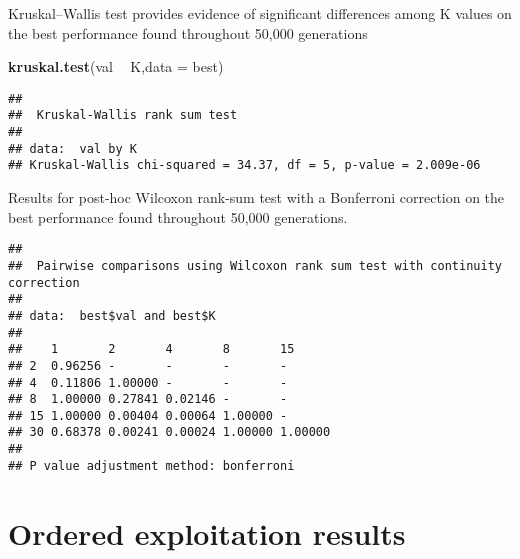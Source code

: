 \documentclass[]{book}
\newenvironment{Shaded}{\begin{snugshade}}{\end{snugshade}}
\newcommand{\DataTypeTok}[1]{\textcolor[rgb]{0.13,0.29,0.53}{#1}}
\newcommand{\KeywordTok}[1]{\textcolor[rgb]{0.13,0.29,0.53}{\textbf{#1}}}
\newcommand{\NormalTok}[1]{#1}
\newcommand{\OperatorTok}[1]{\textcolor[rgb]{0.81,0.36,0.00}{\textbf{#1}}}
\newcommand{\OtherTok}[1]{\textcolor[rgb]{0.56,0.35,0.01}{#1}}
\newcommand{\StringTok}[1]{\textcolor[rgb]{0.31,0.60,0.02}{#1}}
\begin{document}
Kruskal--Wallis test provides evidence of significant differences among K values on the best performance found throughout 50,000 generations

\begin{Shaded}
\begin{Highlighting}[]
\KeywordTok{kruskal.test}\NormalTok{(val }\OperatorTok{~}\StringTok{ }\NormalTok{K,}\DataTypeTok{data =}\NormalTok{ best)}
\end{Highlighting}
\end{Shaded}

\begin{verbatim}
## 
##  Kruskal-Wallis rank sum test
## 
## data:  val by K
## Kruskal-Wallis chi-squared = 34.37, df = 5, p-value = 2.009e-06
\end{verbatim}

Results for post-hoc Wilcoxon rank-sum test with a Bonferroni correction on the best performance found throughout 50,000 generations.

\begin{Shaded}
\end{Shaded}

\begin{verbatim}
## 
##  Pairwise comparisons using Wilcoxon rank sum test with continuity correction 
## 
## data:  best$val and best$K 
## 
##    1       2       4       8       15     
## 2  0.96256 -       -       -       -      
## 4  0.11806 1.00000 -       -       -      
## 8  1.00000 0.27841 0.02146 -       -      
## 15 1.00000 0.00404 0.00064 1.00000 -      
## 30 0.68378 0.00241 0.00024 1.00000 1.00000
## 
## P value adjustment method: bonferroni
\end{verbatim}

\hypertarget{ordered-exploitation-results-6}{%
\section{Ordered exploitation results}\label{ordered-exploitation-results-6}}
\end{document}
